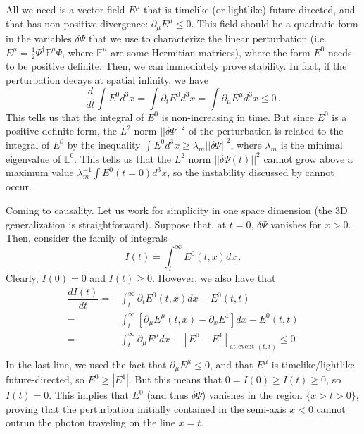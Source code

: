 \documentclass[PRD,onecolumn, nofootinbib]{revtex4-1}
\begin{document}
All we need is a vector field $E^\mu$ that is timelike (or lightlike) future-directed, and that has non-positive divergence: $\partial_\mu E^\mu\leq 0$. This field should be a quadratic form in the variables $\delta \Psi$ that we use to characterize the linear perturbation (i.e. $E^\mu =\frac{1}{2}\Psi^\dagger \mathbb{E}^\mu \Psi$, where $\mathbb{E}^\mu$ are some Hermitian matrices), where the form $E^0$ needs to be positive definite.
Then, we can immediately prove stability. In fact, if the perturbation decays at spatial infinity, we have
\begin{equation}
\dfrac{d}{dt}\int E^0 d^3 x = \int \partial_t E^0 d^3 x= \int \partial_\mu E^\mu d^3 x \leq 0\, .
\end{equation}
This tells us that the integral of $E^0$ is non-increasing in time. But since $E^0$ is a positive definite form, the $L^2$ norm $||\delta \Psi||^2$ of the perturbation is related to the integral of $E^0$ by the inequality $\int E^0 d^3 x \geq \lambda_m ||\delta \Psi||^2$, where $\lambda_m$ is the minimal eigenvalue of $\mathbb{E}^0$. This tells us that the $L^2$ norm $||\delta \Psi(t)||^2$ cannot grow above a maximum value $\lambda_m^{-1}\int E^0(t{=}0) d^3 x$, so the instability discussed by \citet{Hiscock_Insatibility_first_order} cannot occur. 

Coming to causality. Let us work for simplicity in one space dimension (the 3D generalization is straightforward). Suppose that, at $t=0$, $\delta \Psi$ vanishes for $x>0$. Then, consider the family of integrals
\begin{equation}
I(t)=\int_t^\infty E^0(t,x) dx \, .
\end{equation}
Clearly, $I(0)=0$ and $I(t)\geq 0$. However, we also have that
\begin{equation}
\begin{split}
\dfrac{dI(t)}{dt}={}& \int_t^\infty \partial_t E^0(t,x) dx-E^0(t,t) \\
={}& \int_t^\infty [\partial_\mu E^\mu(t,x)-\partial_x E^1] dx-E^0(t,t) \\
={}& \int_t^\infty \partial_\mu E^\mu dx-[E^0-E^1]_{\text{at event }(t,t)} \leq 0 \\
\end{split}
\end{equation}
In the last line, we used the fact that $\partial_\mu E^\mu\leq 0$, and that $E^\mu$ is timelike/lightlike future-directed, so $E^0 \geq |E^1|$. But this means that $0=I(0)\geq I(t) \geq 0$, so $I(t)=0$. This implies that $E^0$ (and thus $\delta \Psi$) vanishes in the region $\{x>t>0\}$, proving that the perturbation initially contained in the semi-axis $x<0$ cannot outrun the photon traveling on the line $x=t$.\\
\end{document}
